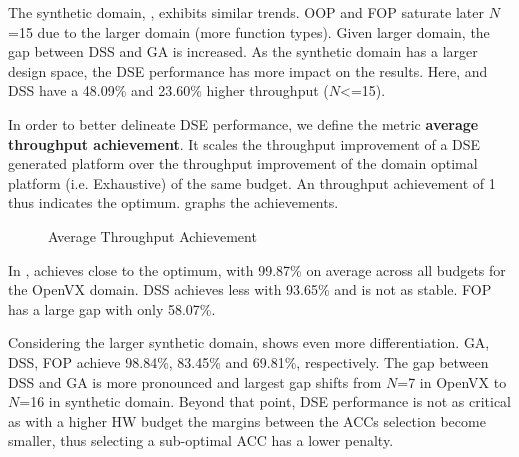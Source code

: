 The synthetic domain, , exhibits similar trends. OOP and FOP saturate later $N$=15 due to the larger domain (more function types). Given larger domain, the gap between DSS and GA is increased. As the synthetic domain has a larger design space, the DSE performance has more impact on the results. Here, \ga and DSS have a 48.09\% and 23.60\% higher throughput ($N$\textless=15).

In order to better delineate DSE performance, we define the metric \textbf{average throughput achievement}. It scales the throughput improvement of a DSE generated platform over the throughput improvement of the domain optimal platform (i.e. Exhaustive) of the same budget. An throughput achievement of 1 thus indicates the optimum.  graphs the achievements.

\begin{figure}[htbp]
	\centering
		\hfill
	\caption{Average Throughput Achievement}
	\label{res:pa}
\end{figure}

In , \ga achieves close to the optimum, with 99.87\% on average across all budgets for the OpenVX domain. DSS achieves less with 93.65\% and is not as stable. FOP has a large gap with only 58.07\%.

Considering the larger synthetic domain,  shows even more differentiation. GA, DSS, FOP achieve 98.84\%, 83.45\% and 69.81\%, respectively. The gap between DSS and GA is more pronounced and largest gap shifts from $N$=7 in OpenVX to $N$=16 in synthetic domain. Beyond that point, DSE performance is not as critical as with a higher HW budget the margins between the ACCs selection become smaller, thus selecting a sub-optimal ACC has a lower penalty.


